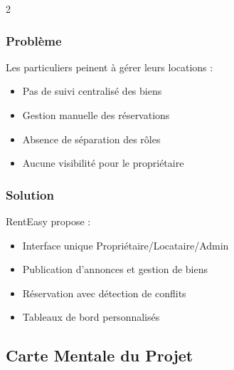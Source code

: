 \documentclass[12pt,a4paper]{article}
\begin{document}
\begin{multicols}{2}

\subsubsection*{Problème}
Les particuliers peinent à gérer leurs locations :
\begin{itemize}[nosep]
  \item Pas de suivi centralisé des biens
  \item Gestion manuelle des réservations
  \item Absence de séparation des rôles
  \item Aucune visibilité pour le propriétaire
\end{itemize}

\columnbreak

\subsubsection*{Solution}
RentEasy propose :
\begin{itemize}[nosep]
  \item Interface unique Propriétaire/Locataire/Admin
  \item Publication d'annonces et gestion de biens
  \item Réservation avec détection de conflits
  \item Tableaux de bord personnalisés
\end{itemize}

\end{multicols}

\newpage

\subsection{Carte Mentale du Projet}
\end{document}
